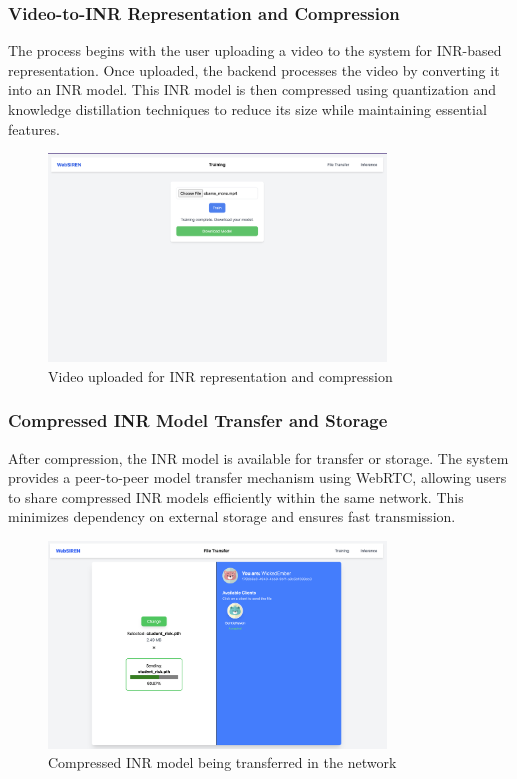     \subsubsection{Video-to-INR Representation and Compression}
    
    The process begins with the user uploading a video to the system for INR-based representation. Once uploaded, the backend processes the video by converting it into an INR model. This INR model is then compressed using quantization and knowledge distillation techniques to reduce its size while maintaining essential features.
    
    \vspace{10pt}
    \begin{figure}[H]
        \centering
        \includegraphics[width=0.8\textwidth]{assets/website/training_process.png}
        \caption{Video uploaded for INR representation and compression}
        \label{fig:video_upload}
    \end{figure}
    
    \subsubsection{Compressed INR Model Transfer and Storage}
    
    After compression, the INR model is available for transfer or storage. The system provides a peer-to-peer model transfer mechanism using WebRTC, allowing users to share compressed INR models efficiently within the same network. This minimizes dependency on external storage and ensures fast transmission.
    
    \vspace{10pt}
    \begin{figure}[H]
        \centering
        \includegraphics[width=0.8\textwidth]{assets/website/sending_model.png}
        \caption{Compressed INR model being transferred in the network}
        \label{fig:model_transfer}
    \end{figure}
    
